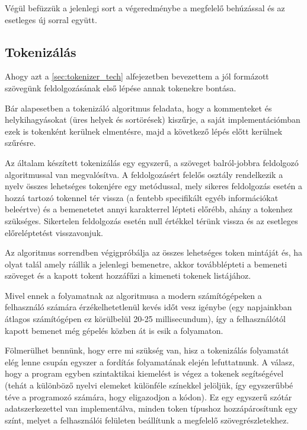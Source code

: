 Végül befüzzük a jelenlegi sort a végeredménybe a megfelelő behúzással és az esetleges új sorral együtt.

\subsection{Tokenizálás}
\label{sec:tokenizer}

Ahogy azt a \ref{sec:tokenizer_tech} alfejezetben bevezettem a jól formázott szövegünk feldolgozásának első lépése annak tokenekre bontása.

Bár alapesetben a tokenizáló algoritmus feladata, hogy a kommenteket és helykihagyásokat (üres helyek és sortörések) kiszűrje, a saját implementációmban ezek is tokenként kerülnek elmentésre, majd a következő lépés előtt kerülnek szűrésre.

Az általam készített tokenizálás egy egyszerű, a szöveget balról-jobbra feldolgozó algoritmussal van megvalósítva. A feldolgozásért felelős osztály rendelkezik a nyelv összes lehetséges tokenjére egy metódussal, mely sikeres feldolgozás esetén a hozzá tartozó tokennel tér vissza (a fentebb specifikált egyéb információkat beleértve) és a bemenetetet annyi karakterrel lépteti előrébb, ahány a tokenhez szükséges. Sikertelen feldolgozás esetén null értékkel térünk vissza és az esetleges előreléptetést visszavonjuk.

Az algoritmus sorrendben végigpróbálja az összes lehetséges token mintáját és, ha olyat talál amely ráillik a jelenlegi bemenetre, akkor továbblépteti a bemeneti szöveget és a kapott tokent hozzáfűzi a kimeneti tokenek listájához.

Mivel ennek a folyamatnak az algoritmusa a modern számítógépeken a felhasználó számára érzékelhetetlenül kevés időt vesz igénybe (egy napjainkban átlagos számítógépen ez körülbelül 20-25 millisecundum), így a felhasználótól kapott bemenet még gépelés közben át is esik a folyamaton. 

Fölmerülhet bennünk, hogy erre mi szükség van, hisz a tokenizálás folyamatát elég lenne csupán egyszer a fordítás folyamatának elején lefuttatnunk. A válasz, hogy a program egyben szintaktikai kiemelést is végez a tokenek segítségével (tehát a különböző nyelvi elemeket különféle színekkel jelöljük, így egyszerűbbé téve a programozó számára, hogy eligazodjon a kódon). Ez egy egyszerű szótár adatszerkezettel van implementálva, minden token típushoz hozzápárosítunk egy színt, melyet a felhasználói felületen beállítunk a megfelelő szövegrészletekhez.

